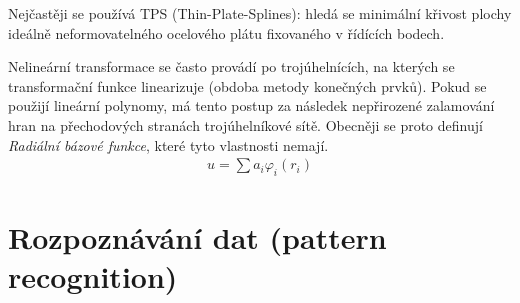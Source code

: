 Nejčastěji se používá TPS (Thin-Plate-Splines): hledá se minimální křivost plochy ideálně neformovatelného ocelového plátu fixovaného v řídících bodech.

Nelineární transformace se často provádí po trojúhelnících, na kterých se transformační funkce linearizuje 
(obdoba metody konečných prvků).
Pokud se použijí lineární polynomy, má tento postup za následek nepřirozené zalamování hran na přechodových stranách
trojúhelníkové sítě. Obecněji se proto definují \emph{Radiální bázové funkce}, které tyto vlastnosti nemají.
\begin{align}
u=\sum a_i\varphi_i(r_i)
\end{align}

\begin{figure}[htb]
\begin{minipage}[t]{0.33\textwidth}\captionsetup{width=0.9\textwidth}
\end{minipage}%
\hfill%
\begin{minipage}[t]{0.33\textwidth}\captionsetup{width=0.9\textwidth}
\end{minipage}%
\hfill%
\begin{minipage}[t]{0.33\textwidth}\captionsetup{width=0.9\textwidth}
\end{minipage}
\end{figure}

\begin{figure}[htb]
\begin{minipage}[t]{0.33\textwidth}\captionsetup{width=0.9\textwidth}
\end{minipage}%
\hfill%
\begin{minipage}[t]{0.33\textwidth}\captionsetup{width=0.9\textwidth}
\end{minipage}%
\hfill%
\begin{minipage}[t]{0.33\textwidth}\captionsetup{width=0.9\textwidth}
\end{minipage}
\end{figure}

\section{Rozpoznávání dat (pattern recognition)}
